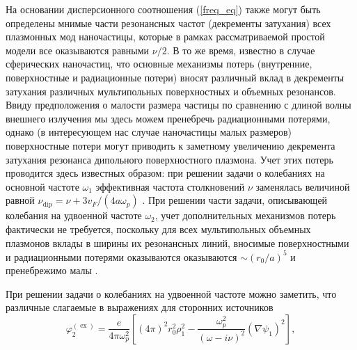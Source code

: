 \documentclass[12pt, a4paper]{article}
\def \w {\omega}
\def \ph {\varphi}
\def \ex { \operatorname{ex}}
\newcommand{\op}[1]{\operatorname {#1}}
\begin{document}
На основании дисперсионного соотношения (\ref{freq_eq}) также могут быть определены мнимые части резонансных частот (декременты затухания) всех плазмонных мод наночастицы, которые в рамках рассматриваемой простой модели все оказываются равными $\nu/2$.
В то же время, известно в случае сферических наночастиц, что основные механизмы потерь (внутренние, поверхностные и радиационные потери) вносят различный вклад в декременты затухания различных мультипольных поверхностных и объемных резонансов. Ввиду предположения о малости размера частицы по сравнению с длиной волны внешнего излучения мы здесь можем пренебречь радиационными потерями, однако (в интересующем нас случае наночастицы малых размеров) поверхностные потери могут приводить к заметному увеличению декремента затухания резонанса дипольного поверхностного плазмона. Учет этих потерь проводится здесь известных образом: при решении задачи о колебаниях на основной частоте $\w_1$ эффективная частота столкновений $\nu$ заменялась величиной равной $\nu_{\op{dip}} = \nu + 3 v_F / (4a \w_p)$ \cite{Hovel1993}. При решении части задачи, описывающей колебания на удвоенной частоте $\w_2$, учет дополнительных механизмов потерь фактически не требуется, поскольку для всех мультипольных объемных плазмонов вклады в ширины их резонансных линий, вносимые поверхностными и радиационными потерями оказываются оказываются $\sim(r_0/a)^5$ и пренебрежимо малы \cite{Gildenburg2016}.


При решении задачи о колебаниях на удвоенной частоте можно заметить, что различные слагаемые в выражениях для сторонних источников
\begin{equation} 	
	\ph^{(\ex)}_2 = \frac{e}{4 \pi \w_p^2}\left[(4\pi)
	^2r_0^2\rho_1^2 - \frac{\w_p^2}{(\w - i \nu)^2}(\nabla \psi_1)^2\right], 
\end{equation}
\end{document}
